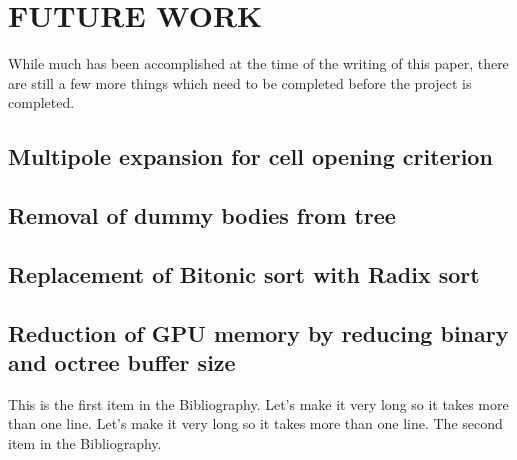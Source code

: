 \documentclass{thesis}
\begin{document}
\chapter{FUTURE WORK}
While much has been accomplished at the time of the writing of this paper, there are still a few more things which need to be completed before the project is completed.

\section{Multipole expansion for cell opening criterion}
\section{Removal of dummy bodies from tree}
\section{Replacement of Bitonic sort with Radix sort}
\section{Reduction of GPU memory by reducing binary and octree buffer size}


\begin{singlespace}
\begin{thebibliography}{99}
 This is the first item in the Bibliography.
Let's make it very long so it takes more than one line.
Let's make it very long so it takes more than one line.
 The second item in the Bibliography.
\end{thebibliography}
\end{singlespace}

\appendix    %
\end{document}
